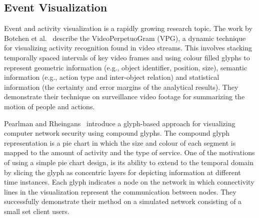 \subsection{Event Visualization}


Event and activity visualization is a rapidly growing research topic. 
The work by Botchen et al.~\cite{botchen08ActionBasedVideo} describe the VideoPerpetuoGram (VPG), a dynamic technique for visualizing activity recognition found in video streams. This involves stacking temporally spaced intervals of key video frames and using colour filled glyphs to represent geometric information (e.g., object identifier, position, size), semantic information (e.g., action type and inter-object relation) and statistical information (the certainty and error margins of the analytical results). They demonstrate their technique on surveillance video footage for summarizing the motion of people and actions.

Pearlman and Rheingans~\cite{pearlman08securityEvent} introduce a glyph-based approach for visualizing computer network security using compound glyphs. The compound glyph representation is a pie chart in which the size and colour of each segment is mapped to the amount of activity and the type of service.
One of the motivations of using a simple pie chart design, is its ability to extend to the temporal domain by slicing the glyph as concentric layers for depicting information at different time instances.
Each glyph indicates a node on the network in which connectivity lines in the visualization represent the communication between nodes.
They successfully demonstrate their method on a simulated network consisting of a small set client users.

